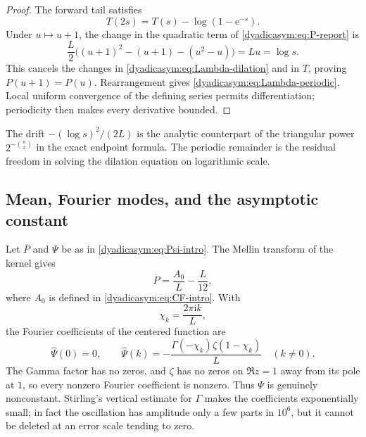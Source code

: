 \documentclass[11pt,oneside]{article}
\theoremstyle{definition}
\theoremstyle{remark}
\newcommand{\e}{\mathrm e}
\newcommand{\ii}{\mathrm i}
\begin{document}
\begin{proof}
The forward tail satisfies
\begin{equation*}
 T(2s)=T(s)-\log(1-\e^{-s}).
\end{equation*}
Under $u\mapsto u+1$, the change in the quadratic term of \eqref{dyadicasym:eq:P-report} is
\begin{equation*}
 \frac L2\bigl((u+1)^2-(u+1)-(u^2-u)\bigr)=Lu=\log s.
\end{equation*}
This cancels the changes in \eqref{dyadicasym:eq:Lambda-dilation} and in $T$, proving
$P(u+1)=P(u)$.  Rearrangement gives \eqref{dyadicasym:eq:Lambda-periodic}.  Local uniform convergence of
the defining series permits differentiation; periodicity then makes every derivative bounded.
\end{proof}

The drift $-(\log s)^2/(2L)$ is the analytic counterpart of the triangular power
$2^{-\binom n2}$ in the exact endpoint formula.  The periodic remainder is the residual
freedom in solving the dilation equation on logarithmic scale.

\subsection{Mean, Fourier modes, and the asymptotic constant}

Let $\overline P$ and $\Psi$ be as in \eqref{dyadicasym:eq:Psi-intro}.  The Mellin transform of the
kernel gives
\begin{equation}
 \overline P=\frac{A_0}{L}-\frac L{12},                     \label{dyadicasym:eq:P-mean}
\end{equation}
where $A_0$ is defined in \eqref{dyadicasym:eq:CF-intro}.  With
\begin{equation}
 \chi_k=\frac{2\pi\ii k}{L},                                \label{dyadicasym:eq:chi}
\end{equation}
the Fourier coefficients of the centered function are
\begin{equation}
 \widehat\Psi(0)=0,
 \qquad
 \boxed{
 \widehat\Psi(k)=-\frac{\Gamma(-\chi_k)\zeta(1-\chi_k)}L}
 \quad(k\ne0).                                             \label{dyadicasym:eq:Psi-Fourier-report}
\end{equation}
The Gamma factor has no zeros, and $\zeta$ has no zeros on $\Re z=1$ away from its pole at
$1$, so every nonzero Fourier coefficient is nonzero.  Thus $\Psi$ is genuinely nonconstant.
Stirling's vertical estimate for $\Gamma$ makes the coefficients exponentially small; in
fact the oscillation has amplitude only a few parts in $10^6$, but it cannot be deleted at an
error scale tending to zero.
\end{document}
